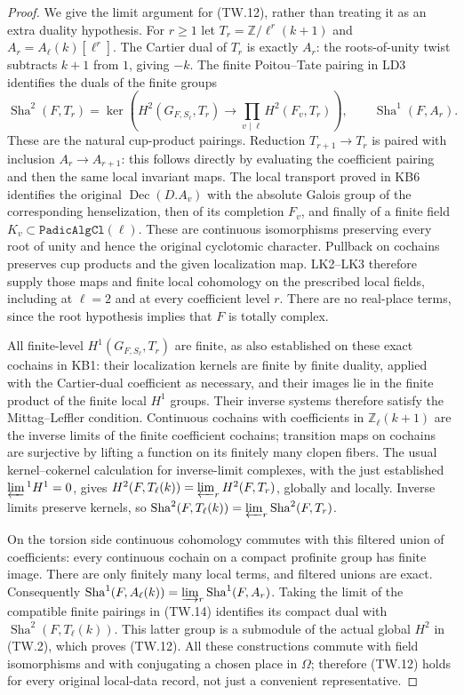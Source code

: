 \begin{proof}
We give the limit argument for (TW.12), rather than treating
it as an extra duality hypothesis.
For $r\ge1$ let
$T_r=\mathbb Z/\ell^r(k+1)$ and
$A_r=A_\ell(k)[\ell^r]$.
The Cartier dual of $T_r$ is exactly $A_r$:
the roots-of-unity twist subtracts $k+1$ from $1$, giving
$-k$.  The finite Poitou--Tate pairing in LD3 identifies
the duals of the finite groups
\[
 \operatorname{Sha}^2(F,T_r)=
 \ker\!\left(H^2(G_{F,S_\ell},T_r)\to
          \prod_{v\mid\ell}H^2(F_v,T_r)\right),
 \qquad \operatorname{Sha}^1(F,A_r).
 \tag{TW.14}
\]
These are the natural cup-product pairings.  Reduction
$T_{r+1}\to T_r$ is paired with inclusion
$A_r\to A_{r+1}$: this follows directly by evaluating the
coefficient pairing and then the same local invariant maps.
The local transport proved in KB6 identifies the original
$\operatorname{Dec}(D.A_v)$ with the absolute Galois group of
the corresponding henselization, then of its completion $F_v$,
and finally of a finite field
$K_v\subset\texttt{PadicAlgCl}(\ell)$.
These are continuous isomorphisms preserving every root of
unity and hence the original cyclotomic character.
Pullback on cochains preserves cup products and the given
localization map.  LK2--LK3 therefore supply those maps and
finite local cohomology on the prescribed local fields,
including at $\ell=2$ and at every coefficient level $r$.
There are no real-place terms, since the root hypothesis
implies that $F$ is totally complex.

All finite-level $H^1(G_{F,S_\ell},T_r)$ are finite, as also
established on these exact cochains in KB1:
their localization kernels are finite by finite duality,
applied with the Cartier-dual coefficient as necessary,
and their images lie in the finite product of the finite
local $H^1$ groups.  Their inverse systems therefore satisfy
the Mittag--Leffler condition.  Continuous cochains with
coefficients in $\mathbb Z_\ell(k+1)$ are the inverse limits
of the finite coefficient cochains; transition maps on cochains
are surjective by lifting a function on its finitely many
clopen fibers.  The usual kernel--cokernel calculation for
inverse-limit complexes, with the just established
$\varprojlim{}^1H^1=0$, gives
$H^2(F,T_\ell(k))=\varprojlim_r H^2(F,T_r)$, globally
and locally.  Inverse limits preserve kernels, so
$\operatorname{Sha}^2(F,T_\ell(k))
=\varprojlim_r\operatorname{Sha}^2(F,T_r)$.

On the torsion side continuous cohomology commutes with this
filtered union of coefficients: every continuous cochain on a
compact profinite group has finite image.  There are only
finitely many local terms, and filtered unions are exact.
Consequently
$\operatorname{Sha}^1(F,A_\ell(k))
=\varinjlim_r\operatorname{Sha}^1(F,A_r)$.
Taking the limit of the compatible finite pairings in (TW.14)
identifies its compact dual with $\operatorname{Sha}^2(F,T_\ell(k))$.
This latter group is a submodule of the actual global $H^2$
in (TW.2), which proves (TW.12).  All these constructions
commute with field isomorphisms and with conjugating a chosen
place in $\Omega$; therefore (TW.12) holds for every original
local-data record, not just a convenient representative.
\end{proof}

